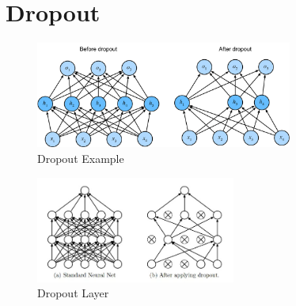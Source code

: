 \section{Dropout \cite{dnn-1,gfg-dropout-in-neural-networks,medium/towardsdatascience.com/dropout-in-neural-networks-47a162d621d9}} \label{Dropout}


\begin{table}[H]
    \begin{minipage}{0.45\linewidth}
        \begin{figure}[H]
            \centering
            \includegraphics[width=\linewidth, height=3.5cm, keepaspectratio]{Pictures/deep_neural_networks/dropout.jpg}
            \caption{Dropout Example \cite{dnn-1}}
        \end{figure}
    \end{minipage}
    \hfill
    \begin{minipage}{0.45\linewidth}
        \begin{figure}[H]
            \centering
            \includegraphics[width=\linewidth, height=3.5cm, keepaspectratio]{Pictures/layers/dropout.jpg}
            \caption{Dropout Layer \cite{medium/towardsdatascience.com/dropout-in-neural-networks-47a162d621d9}}
        \end{figure}
    \end{minipage}
\end{table}


